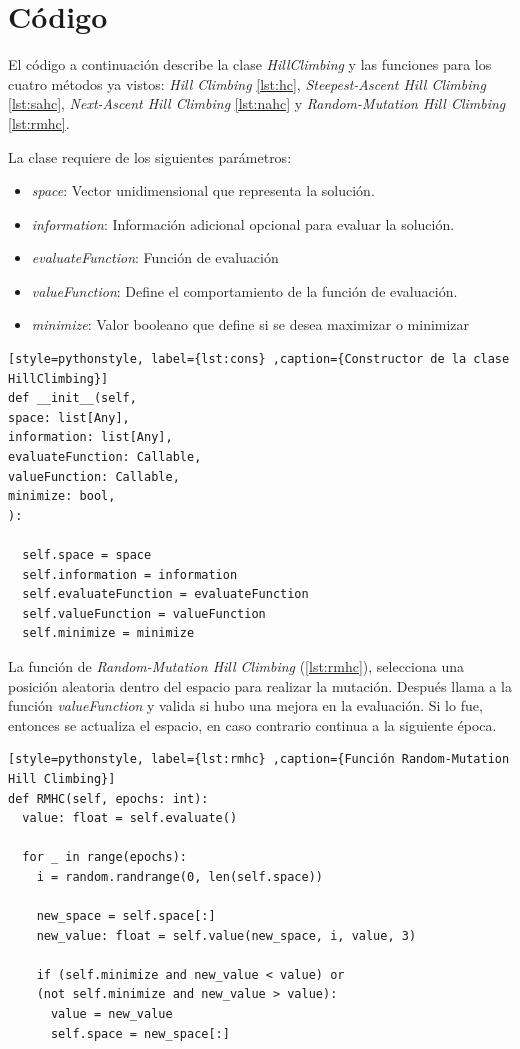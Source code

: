 \documentclass[12pt,twoside]{article}
\begin{document}
\clearpage
\section{Código}

El código a continuación describe la clase \textit{HillClimbing} y las funciones para los cuatro métodos ya vistos: \textit{Hill Climbing} \ref{lst:hc}, \textit{Steepest-Ascent Hill Climbing} \ref{lst:sahc}, \textit{Next-Ascent Hill Climbing} \ref{lst:nahc} y \textit{Random-Mutation Hill Climbing} \ref{lst:rmhc}.   

La clase requiere de los siguientes parámetros:
\begin{itemize}
	\item \textit{space}: Vector unidimensional que representa la solución.
	\item \textit{information}: Información adicional opcional para evaluar la solución.
	\item \textit{evaluateFunction}: Función de evaluación
	\item \textit{valueFunction}: Define el comportamiento de la función de evaluación.
	\item \textit{minimize}: Valor booleano que define si se desea maximizar o minimizar
\end{itemize}

\begin{lstlisting}[style=pythonstyle, label={lst:cons} ,caption={Constructor de la clase HillClimbing}]
def __init__(self, 
space: list[Any],
information: list[Any],
evaluateFunction: Callable,
valueFunction: Callable,
minimize: bool,
): 

  self.space = space
  self.information = information
  self.evaluateFunction = evaluateFunction
  self.valueFunction = valueFunction
  self.minimize = minimize  
\end{lstlisting}

La función de \textit{Random-Mutation Hill Climbing} (\ref{lst:rmhc}), selecciona una posición aleatoria dentro del espacio para realizar la mutación. Después llama a la función \textit{valueFunction} y valida si hubo una mejora en la evaluación. Si lo fue, entonces se actualiza el espacio, en caso contrario continua a la siguiente época.

\begin{lstlisting}[style=pythonstyle, label={lst:rmhc} ,caption={Función Random-Mutation Hill Climbing}]
def RMHC(self, epochs: int):
  value: float = self.evaluate()

  for _ in range(epochs):
    i = random.randrange(0, len(self.space))    

    new_space = self.space[:]
    new_value: float = self.value(new_space, i, value, 3)

    if (self.minimize and new_value < value) or 
    (not self.minimize and new_value > value):
      value = new_value
      self.space = new_space[:]
\end{lstlisting}
\end{document}
